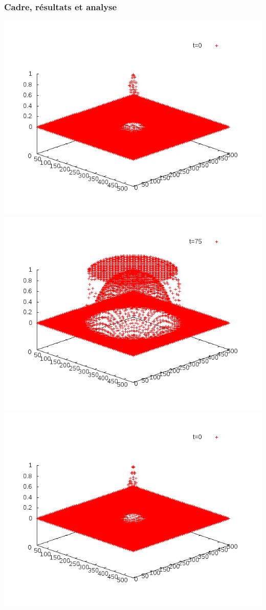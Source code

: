 \documentclass[handout]{beamer}
\begin{document}
\begin{frame}
	\frametitle{Cadre, résultats et analyse}
	\includegraphics[scale=0.2]{img/anim2-10-1.png}
	\includegraphics[scale=0.2]{img/anim2-10-150.png}\\
	\includegraphics[scale=0.2]{img/anim2-80-1.png}

\end{frame}
\end{document}
